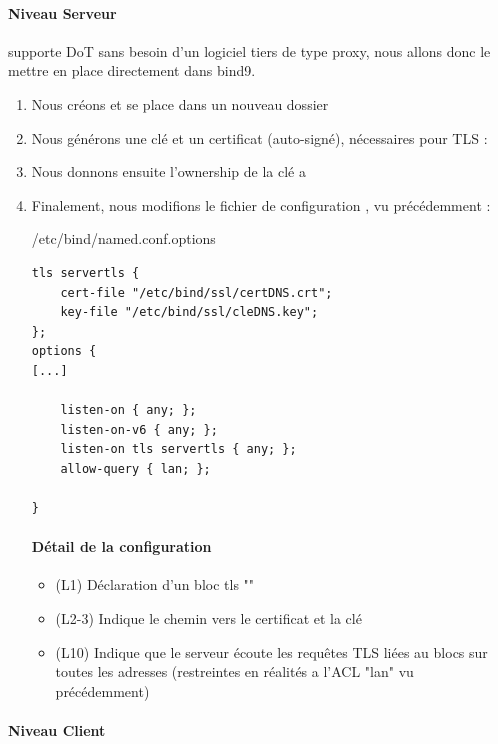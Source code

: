 \documentclass{article}
\begin{document}
\paragraph{Niveau Serveur\\}
 supporte DoT sans besoin d'un logiciel tiers de type proxy, nous allons donc le mettre en place directement dans bind9.
\begin{enumerate}
	\item Nous créons et se place dans un nouveau dossier 
	\item Nous générons une clé et un certificat (auto-signé), nécessaires pour TLS :
	\item Nous donnons ensuite l'ownership de la clé a 
	\item Finalement, nous modifions le fichier de configuration , vu précédemment : 
	\begin{configbox}{/etc/bind/named.conf.options}
		\begin{lstlisting}
tls servertls {
	cert-file "/etc/bind/ssl/certDNS.crt";
	key-file "/etc/bind/ssl/cleDNS.key";
};
options {
[...]

	listen-on { any; };
	listen-on-v6 { any; };
	listen-on tls servertls { any; };
	allow-query { lan; };

}
		\end{lstlisting}
	\end{configbox}
	\paragraph{Détail de la configuration}
	\begin{itemize}
		\item (L1) Déclaration d'un bloc tls ""
		\item (L2-3) Indique le chemin vers le certificat et la clé
		\item (L10) Indique que le serveur écoute les requêtes TLS liées au blocs  sur toutes les adresses (restreintes en réalités a l'ACL "lan" vu précédemment)
	\end{itemize}
\end{enumerate}

\paragraph{Niveau Client\\}
\end{document}
